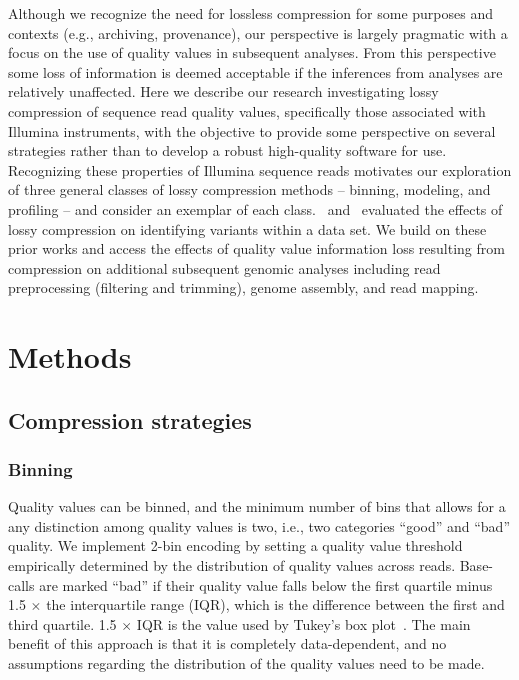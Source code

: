 Although we recognize the need for lossless compression for some
purposes and contexts (e.g., archiving, provenance), our perspective
is largely pragmatic with a focus on the use of quality values in
subsequent analyses. From this perspective some loss of information is
deemed acceptable if the inferences from analyses are relatively
unaffected. Here we describe our research investigating lossy
compression of sequence read quality values, specifically those
associated with Illumina instruments, with the objective to provide
some perspective on several strategies rather than to develop a robust
high-quality software for use. Recognizing these properties of
Illumina sequence reads motivates our exploration of three general
classes of lossy compression methods -- binning, modeling, and
profiling -- and consider an exemplar of each class.~\cite{Canovas:2014fr} and~\cite{janin2013adaptive} evaluated the effects of lossy compression on identifying variants within a data set. We build on these prior works and access the effects of
quality value information loss resulting from compression on additional
subsequent genomic analyses including read preprocessing (filtering
and trimming), genome assembly, and read mapping.

\section{Methods}

\subsection{Compression strategies}

\subsubsection{Binning}

Quality values can be binned, and the minimum number of bins that
allows for a any distinction among quality values is two, i.e., two
categories ``good'' and ``bad'' quality. We implement 2-bin encoding
by setting a quality value threshold empirically determined by the
distribution of quality values across reads. Base-calls are marked
``bad'' if their quality value falls below the first quartile minus
1.5 $\times$ the interquartile range (IQR), which is the difference
between the first and third quartile. 1.5 $\times$ IQR is the value
used by Tukey's box plot~\cite{mcgill1978variations}. The main
benefit of this approach is that it is completely data-dependent, and
no assumptions regarding the distribution of the quality values need
to be made.

